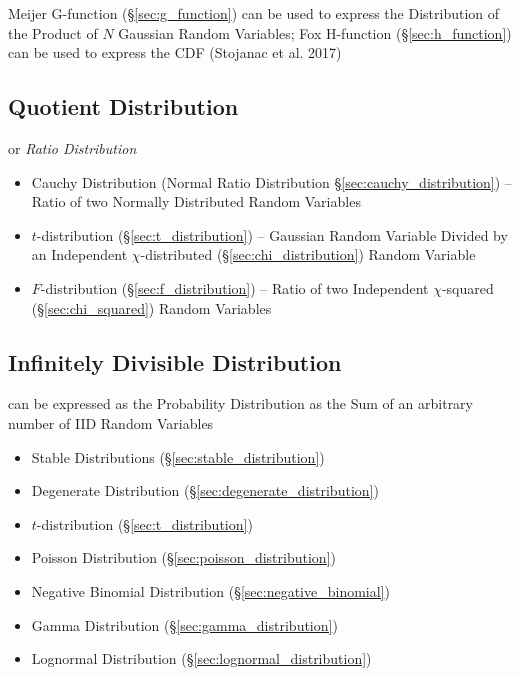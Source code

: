 \fist Meijer G-function (\S\ref{sec:g_function}) can be used to express the
Distribution of the Product of $N$ Gaussian Random Variables; Fox H-function
(\S\ref{sec:h_function}) can be used to express the CDF (Stojanac et al. 2017)



\subsection{Quotient Distribution}\label{sec:quotient_distribution}

or \emph{Ratio Distribution}

\begin{itemize}
  \item Cauchy Distribution (Normal Ratio Distribution
    \S\ref{sec:cauchy_distribution}) -- Ratio of two Normally Distributed Random
    Variables
  \item $t$-distribution (\S\ref{sec:t_distribution}) -- Gaussian Random
    Variable Divided by an Independent $\chi$-distributed
    (\S\ref{sec:chi_distribution}) Random Variable
  \item $F$-distribution (\S\ref{sec:f_distribution}) -- Ratio of two
    Independent $\chi$-squared (\S\ref{sec:chi_squared}) Random Variables
\end{itemize}



\subsection{Infinitely Divisible Distribution}
\label{sec:infinitely_divisible}

can be expressed as the Probability Distribution as the Sum of an arbitrary
number of IID Random Variables

\begin{itemize}
  \item Stable Distributions (\S\ref{sec:stable_distribution})
  \item Degenerate Distribution (\S\ref{sec:degenerate_distribution})
  \item $t$-distribution (\S\ref{sec:t_distribution})
  \item Poisson Distribution (\S\ref{sec:poisson_distribution})
  \item Negative Binomial Distribution (\S\ref{sec:negative_binomial})
  \item Gamma Distribution (\S\ref{sec:gamma_distribution})
  \item Lognormal Distribution (\S\ref{sec:lognormal_distribution})
\end{itemize}



